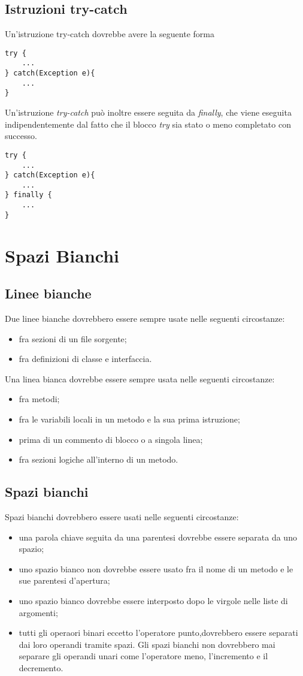 \subsection{Istruzioni try-catch}
Un'istruzione try-catch dovrebbe avere la seguente forma
\begin{lstlisting}
try {
	...
} catch(Exception e){
	...
}
\end{lstlisting}
Un'istruzione \textit{try-catch} può inoltre essere seguita da \textit{finally}, che viene eseguita indipendentemente dal fatto che il blocco \textit{try} sia stato o meno completato con successo.
\begin{lstlisting}
try {
	...
} catch(Exception e){
	...
} finally {
	...
}
\end{lstlisting}
\clearpage
%
%
\section{Spazi Bianchi}
\subsection{Linee bianche}
Due linee bianche dovrebbero essere sempre usate nelle seguenti circostanze:
\begin{itemize}
\item fra sezioni di un file sorgente;
\item fra definizioni di classe e interfaccia.
\end{itemize}
Una linea bianca dovrebbe essere sempre usata nelle seguenti circostanze:
\begin{itemize}
\item fra metodi;
\item fra le variabili locali in un metodo e la sua prima istruzione;
\item prima di un commento di blocco o a singola linea;
\item fra sezioni logiche all'interno di un metodo.
\end{itemize}
\subsection{Spazi bianchi}
Spazi bianchi dovrebbero essere usati nelle seguenti circostanze:
\begin{itemize}
\item una parola chiave seguita da una parentesi dovrebbe essere separata da uno spazio;
\item uno spazio bianco non dovrebbe essere usato fra il nome di un metodo e le sue parentesi d'apertura;
\item uno spazio bianco dovrebbe essere interposto dopo le virgole nelle liste di argomenti;
\item tutti gli operaori binari eccetto l'operatore punto,dovrebbero essere separati dai loro operandi tramite spazi. Gli spazi bianchi non dovrebbero mai separare gli operandi unari come l'operatore meno, l'incremento e il decremento.
\end{itemize}
\clearpage
%
%
